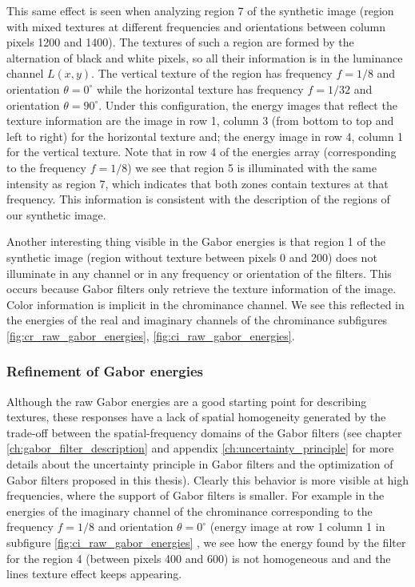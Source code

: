 This same effect is seen when analyzing region 7 of the synthetic image (region with mixed textures at different frequencies and orientations between column pixels 1200 and 1400). The textures of such a region are formed by the alternation of black and white pixels, so all their information is in the luminance channel $L(x, y)$. The vertical texture of the region has frequency $f = 1/8$ and orientation $\theta = 0^\circ$ while the horizontal texture has frequency $f = 1/32$ and orientation $\theta = 90^\circ$. Under this configuration, the energy images that reflect the texture information are the image in row 1, column 3  (from bottom to top and left to right) for the horizontal texture and; the energy image in row 4, column 1 for the vertical texture. Note that in row 4 of the energies array (corresponding to the frequency $f = 1/8$) we see that region 5 is illuminated with the same intensity as region 7, which indicates that both zones contain textures at that frequency. This information is consistent with the description of the regions of our synthetic image.

Another interesting thing visible in the Gabor energies is that region 1 of the synthetic image (region without texture between pixels 0 and 200) does not illuminate in any channel or in any frequency or orientation of the filters. This occurs because Gabor filters only retrieve the texture information of the image. Color information is implicit in the chrominance channel. We see this reflected in the energies of the real and imaginary channels of the chrominance subfigures \ref{fig:cr_raw_gabor_energies}, \ref{fig:ci_raw_gabor_energies}. 


\subsubsection{Refinement of Gabor energies}

Although the raw Gabor energies are a good starting point for describing textures, these responses have a lack of spatial homogeneity generated by the trade-off between the spatial-frequency domains of the Gabor filters (see chapter \ref{ch:gabor_filter_description} and appendix \ref{ch:uncertainty_principle} for more details about the uncertainty principle in Gabor filters and the optimization of  Gabor filters proposed in this thesis). Clearly this behavior is more visible at high frequencies, where the support of Gabor filters is smaller. For example in the energies of the imaginary channel of the chrominance corresponding to the frequency $f=1/8$ and orientation $\theta = 0^\circ$ (energy image at row 1 column 1 in subfigure \ref{fig:ci_raw_gabor_energies} , we see how the energy found by the filter for the region 4 (between pixels 400 and 600) is not homogeneous and and the lines texture effect keeps appearing.

